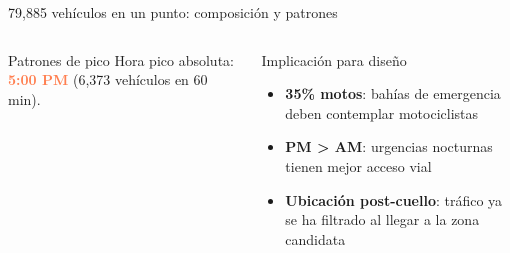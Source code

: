 \documentclass[aspectratio=169, 11pt]{beamer}
\newcommand{\danger}[1]{\textcolor{coral}{\textbf{#1}}}
\begin{document}
\begin{frame}{79,885 vehículos en un punto: composición y patrones}
\begin{columns}[T]
\begin{alertblock}{\small Patrones de pico}
\vspace{3pt}
Hora pico absoluta: \danger{5:00 PM} (6,373 vehículos en 60 min).
\end{alertblock}

\vspace{3pt}
\begin{exampleblock}{\small Implicación para diseño}
\scriptsize
\begin{itemize}\setlength{\itemsep}{0pt}
  \item \textbf{35\% motos}: bahías de emergencia deben contemplar motociclistas
  \item \textbf{PM > AM}: urgencias nocturnas tienen mejor acceso vial
  \item \textbf{Ubicación post-cuello}: tráfico ya se ha filtrado al llegar a la zona candidata
\end{itemize}
\end{exampleblock}
\end{columns}

\end{frame}
\end{document}
